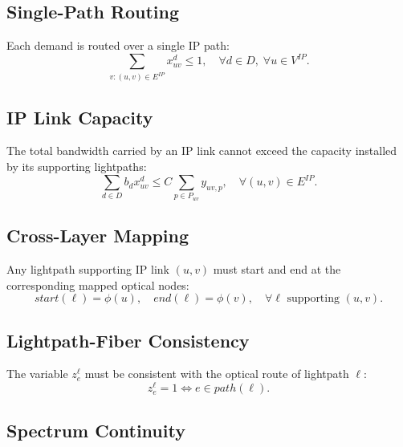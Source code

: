 \documentclass[journal,10pt]{IEEEtran}
\begin{document}
\subsection{Single-Path Routing}

Each demand is routed over a single IP path:
\begin{equation}
    \sum_{v:(u,v)\in E^{IP}} x^{d}_{uv} \leq 1,
    \quad \forall d\in D,\; \forall u\in V^{IP}.
    \label{eq:single-path}
\end{equation}

\subsection{IP Link Capacity}

The total bandwidth carried by an IP link cannot exceed the capacity installed by its supporting lightpaths:
\begin{equation}
    \sum_{d\in D} b_d x^{d}_{uv}
    \leq
    C \sum_{p\in P_{uv}} y_{uv,p},
    \quad \forall (u,v)\in E^{IP}.
    \label{eq:capacity}
\end{equation}

\subsection{Cross-Layer Mapping}

Any lightpath supporting IP link $(u,v)$ must start and end at the corresponding mapped optical nodes:
\begin{equation}
    start(\ell) = \phi(u),\quad end(\ell) = \phi(v),
    \quad \forall \ell \text{ supporting } (u,v).
    \label{eq:mapping}
\end{equation}

\subsection{Lightpath-Fiber Consistency}

The variable $z^{\ell}_{e}$ must be consistent with the optical route of lightpath $\ell$:
\begin{equation}
    z^{\ell}_{e}=1
    \Longleftrightarrow
    e \in path(\ell).
    \label{eq:z-consistency}
\end{equation}

\subsection{Spectrum Continuity}
\end{document}
